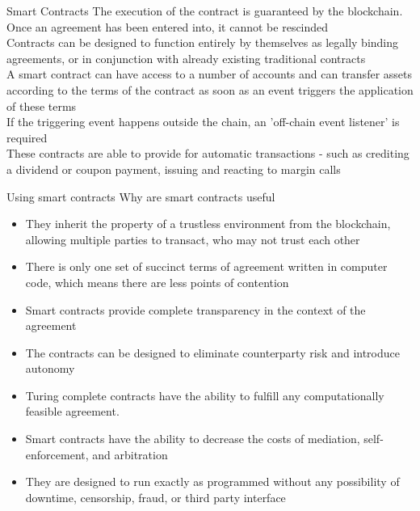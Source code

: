 \documentclass[11pt]{beamer}
\begin{document}
\begin{frame}{Smart Contracts}
	The execution of the contract is guaranteed by the blockchain. Once an agreement has been entered into, it cannot be rescinded \\ \vspace{2mm}
	Contracts can be designed to function entirely by themselves as legally binding agreements, or in conjunction with already existing traditional contracts \\ \vspace{2mm}
	A smart contract can have access to a number of accounts and can transfer assets according to the terms of the contract as soon as an event triggers the application of these terms \\ \vspace{2mm}
	If the triggering event happens outside the chain, an 'off-chain event listener' is required \\ \vspace{2mm}
	These contracts are able to provide for automatic transactions - such as crediting a dividend or coupon payment, issuing and reacting to margin calls
\end{frame}


\begin{frame}{Using smart contracts}
	Why are smart contracts useful
	\begin{itemize}
		\item They inherit the property of a trustless environment from the blockchain, allowing multiple parties to transact, who may not trust each other
		\item There is only one set of succinct terms of agreement written in computer code, which means there are less points of contention
		\item Smart contracts provide complete transparency in the context of the agreement
		\item The contracts can be designed to eliminate counterparty risk and introduce autonomy
		\item Turing complete contracts have the ability to fulfill any computationally feasible agreement.
		\item Smart contracts have the ability to decrease the costs of mediation, self-enforcement, and arbitration
		\item They are designed to run exactly as programmed without any possibility of downtime, censorship, fraud, or third party interface
	\end{itemize}
\end{frame}
\end{document}
